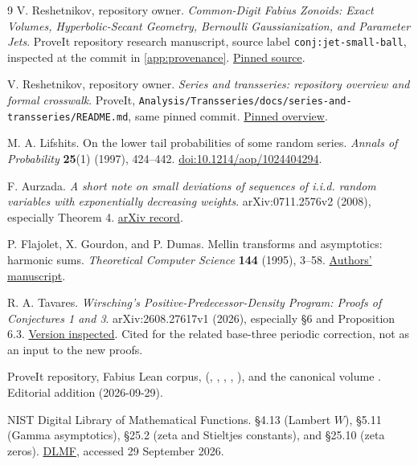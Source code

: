 \documentclass[11pt,a4paper]{article}
\numberwithin{equation}{section}
\theoremstyle{definition}
\begin{document}
\begin{thebibliography}{9}
V. Reshetnikov, repository owner.
\emph{Common-Digit Fabius Zonoids: Exact Volumes, Hyperbolic-Secant Geometry, Bernoulli Gaussianization, and Parameter Jets}.
ProveIt repository research manuscript, source label \texttt{conj:jet-small-ball}, inspected at the commit in \cref{app:provenance}.
\href{https://github.com/VladimirReshetnikov/ProveIt/blob/aab173a7ccdd48add72191d68ce6b0c12ffd72fe/Analysis/FabiusFunction/docs/semi-formalized-research-frontiers/drafts/representations/common_digit_fabius_zonoids_frontier_report/common_digit_fabius_zonoids.tex}{Pinned source}.

V. Reshetnikov, repository owner.
\emph{Series and transseries: repository overview and formal crosswalk}.
ProveIt, \texttt{Analysis/Transseries/docs/series-and-transseries/README.md}, same pinned commit.
\href{https://github.com/VladimirReshetnikov/ProveIt/blob/aab173a7ccdd48add72191d68ce6b0c12ffd72fe/Analysis/Transseries/docs/series-and-transseries/README.md}{Pinned overview}.

M. A. Lifshits.
On the lower tail probabilities of some random series.
\emph{Annals of Probability} \textbf{25}(1) (1997), 424--442.
\href{https://doi.org/10.1214/aop/1024404294}{doi:10.1214/aop/1024404294}.

F. Aurzada.
\emph{A short note on small deviations of sequences of i.i.d. random variables with exponentially decreasing weights}.
arXiv:0711.2576v2 (2008), especially Theorem 4.
\href{https://arxiv.org/abs/0711.2576}{arXiv record}.

P. Flajolet, X. Gourdon, and P. Dumas.
Mellin transforms and asymptotics: harmonic sums.
\emph{Theoretical Computer Science} \textbf{144} (1995), 3--58.
\href{https://algo.inria.fr/flajolet/Publications/mellin-harm.pdf}{Authors' manuscript}.

R. A. Tavares.
\emph{Wirsching's Positive-Predecessor-Density Program: Proofs of Conjectures 1 and 3}.
arXiv:2608.27617v1 (2026), especially \S6 and Proposition 6.3.
\href{https://arxiv.org/html/2608.27617v1}{Version inspected}.
Cited for the related base-three periodic correction, not as an input to the new proofs.

ProveIt repository, Fabius Lean corpus, 
(, , , , ),
and the canonical volume .
Editorial addition (2026-09-29).

NIST Digital Library of Mathematical Functions.
\S4.13 (Lambert $W$), \S5.11 (Gamma asymptotics), \S25.2 (zeta and Stieltjes constants), and \S25.10 (zeta zeros).
\href{https://dlmf.nist.gov/}{DLMF}, accessed 29 September 2026.
\end{thebibliography}
\end{document}
